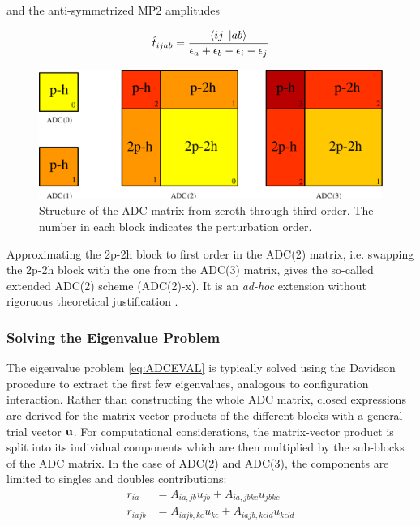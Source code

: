 and the anti-symmetrized MP2 amplitudes

\begin{equation}
\hat{t}_{ijab} = \frac{\sbra{ij}\sket{ab}}{\eps_a + \eps_b - \eps_i - \eps_j}
\end{equation}

\begin{figure}
\centering
\includegraphics[scale=0.4]{Pics/ADCMAT2}
\caption{Structure of the ADC matrix from zeroth through third order. The number in each block indicates the perturbation order.}
\label{fig:ADCMAT}
\end{figure}

Approximating the 2p-2h block to first order in the ADC(2) matrix, i.e. swapping the 2p-2h block with the one from the ADC(3) matrix, gives the so-called extended ADC(2) scheme (ADC(2)-x). It is an \emph{ad-hoc} extension without rigoruous theoretical justification \cite{Tro1995}.  

\subsubsection{Solving the Eigenvalue Problem \label{sec:ADC_DAV}}

The eigenvalue problem \ref{eq:ADCEVAL} is typically solved using the Davidson procedure to extract the first few eigenvalues, analogous to configuration interaction. Rather than constructing the whole ADC matrix, closed expressions are derived for the matrix-vector products of the different blocks with a general trial vector $\mathbf{u}$. For computational considerations, the matrix-vector product is split into its individual components which are then multiplied by the sub-blocks of the ADC matrix. In the case of ADC(2) and ADC(3), the components are limited to singles and doubles contributions:
\begin{align}
r_{ia} &= A_{ia,jb} u_{jb} + A_{ia,jbkc} u_{jbkc} \\
r_{iajb} &= A_{iajb,kc} u_{kc} + A_{iajb,kcld} u_{kcld} 
\end{align}

